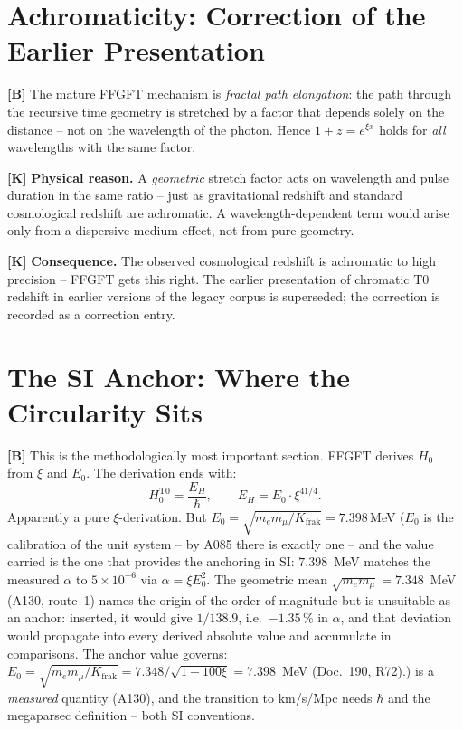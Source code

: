 \section{Achromaticity: Correction of the Earlier Presentation}

\textbf{[B]} The mature FFGFT mechanism is \emph{fractal path elongation}: the
path through the recursive time geometry is stretched by a factor that depends
solely on the distance -- not on the wavelength of the photon. Hence $1+z=e^{\xi x}$
holds for \emph{all} wavelengths with the same factor.

\textbf{[K]} \textbf{Physical reason.} A \emph{geometric} stretch factor acts on
wavelength and pulse duration in the same ratio -- just as gravitational redshift
and standard cosmological redshift are achromatic. A wavelength-dependent term
would arise only from a dispersive medium effect, not from pure geometry.

\textbf{[K]} \textbf{Consequence.} The observed cosmological redshift is achromatic
to high precision -- FFGFT gets this right. The earlier presentation of chromatic
T0 redshift in earlier versions of the legacy corpus is superseded; the correction
is recorded as a correction entry.

\section{The SI Anchor: Where the Circularity Sits}

\textbf{[B]} This is the methodologically most important section. FFGFT derives
$H_0$ from $\xi$ and $E_0$. The derivation ends with:
\[
  H_0^\text{T0} = \frac{E_H}{\hbar},
  \qquad E_H = E_0\cdot\xi^{41/4}.
\]
Apparently a pure $\xi$-derivation. But $E_0=\sqrt{m_em_\mu/K_\text{frak}}=7{.}398\,$MeV ($E_0$ is the calibration of the unit system -- by A085 there is exactly one -- and the value carried is the one that provides the anchoring in SI: $7{.}398$~MeV matches the measured $\alpha$ to $5\times10^{-6}$ via $\alpha = \xi E_0^2$. The geometric mean $\sqrt{m_em_\mu} = 7{.}348$~MeV (A130, route~1) names the origin of the order of magnitude but is unsuitable as an anchor: inserted, it would give $1/138{.}9$, i.e.\ $-1{.}35\,\%$ in $\alpha$, and that deviation would propagate into every derived absolute value and accumulate in comparisons. The anchor value governs: $E_0 = \sqrt{m_em_\mu/K_\text{frak}} = 7{.}348/\sqrt{1-100\xi} = 7{.}398$~MeV (Doc.~190, R72).)
is a \emph{measured} quantity (A130), and the transition to km/s/Mpc needs $\hbar$
and the megaparsec definition -- both SI conventions.

